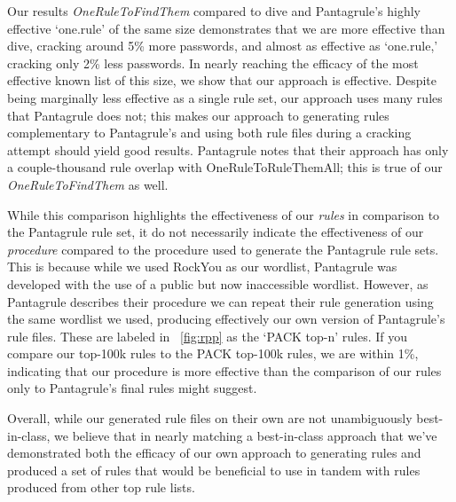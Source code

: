 \documentclass[letterpaper,twocolumn,10pt]{article}
\begin{document}
Our results \textit{OneRuleToFindThem} compared to dive and Pantagrule's highly
effective `one.rule' of the same size demonstrates that we are
more effective than dive, cracking around 5\% more passwords, and almost as effective
as `one.rule,' cracking only 2\% less passwords. In nearly reaching the efficacy of
the most effective known list of this size, we show that our approach is
effective. Despite being marginally less effective as a single rule set, our approach
uses many rules that Pantagrule does not; this makes our approach to generating
rules complementary to Pantagrule's and using both rule files during a cracking
attempt should yield good results. Pantagrule notes that their approach has only
a couple-thousand rule overlap with OneRuleToRuleThemAll; this is true
of our \textit{OneRuleToFindThem} as well.

While this comparison highlights the effectiveness of our \textit{rules} in
comparison to the Pantagrule rule set, it do not necessarily indicate the
effectiveness of our \textit{procedure} compared to the procedure used to
generate the Pantagrule rule sets. This is because while we used RockYou as our
wordlist, Pantagrule was developed with the use of a public but now
inaccessible wordlist. However, as Pantagrule describes their procedure we can
repeat their rule generation using the same wordlist we used, producing
effectively our own version of Pantagrule's rule files. These are labeled in
~\ref{fig:rpp} as the `PACK top-n' rules. If you compare our top-100k rules
to the PACK top-100k rules, we are within 1\%, indicating that our procedure
is more effective than the comparison of our rules only to Pantagrule's final
rules might suggest.

Overall, while our generated rule files on their own are not unambiguously
best-in-class, we believe that in nearly matching a best-in-class approach
that we've demonstrated both the efficacy of our own approach to generating
rules and produced a set of rules that would be beneficial to use in tandem
with rules produced from other top rule lists.
\end{document}
